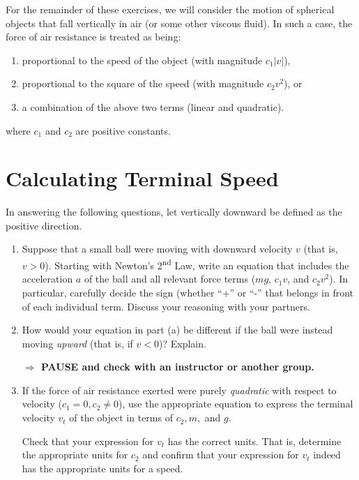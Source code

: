 \documentclass[12pt,hidelinks]{article}
\newcommand{\checkin}{{\bf \noindent $\Rightarrow$ PAUSE and check with an instructor or another
  group.}}
\begin{document}
\newpage
For the remainder of these exercises, we will consider the motion of spherical objects that fall
vertically in air (or some other viscous fluid).  In such a case, the force of air resistance
is treated as being:
\begin{enumerate}[label=(\roman*)]
  \item proportional to the speed of the object (with magnitude $c_1\left|v\right|$),
  \item proportional to the square of the speed (with magnitude $c_2v^2$), or
  \item a combination of the above two terms (linear and quadratic).
\end{enumerate}
where $c_1$ and $c_2$ are positive constants.

\section{Calculating Terminal Speed}
In answering the following questions, let vertically downward be defined as the positive
direction.
\begin{enumerate}
  \item Suppose that a small ball were moving with downward velocity $v$ (that is, $v>0$).
  Starting with Newton's 2\textsuperscript{nd} Law, write an equation that includes the
  acceleration $a$ of the ball and all relevant force terms ($mg$, $c_1v$, and
  $c_2v^2$).  In particular, carefully decide the sign (whether ``+'' or ``-'' that belongs in
  front of each individual term.  Discuss your reasoning with your partners. \vfill
  \item How would your equation in part (a) be different if the ball were instead moving
  \textit{upward} (that is, if $v<0$)? Explain. \vfill

  \checkin
  \item If the force of air resistance exerted were purely \textit{quadratic} with respect to
  velocity ($c_1= 0, c_2\neq 0$), use the appropriate equation to express the terminal velocity
  $v_t$ of the object in terms of $c_2, m,$ and $g$. \vfill

  Check that your expression for $v_t$ has the correct units.  That is, determine the
  appropriate units for $c_2$ and confirm that your expression for $v_t$ indeed has the
  appropriate units for a speed. \vfill
\end{enumerate}
\end{document}
